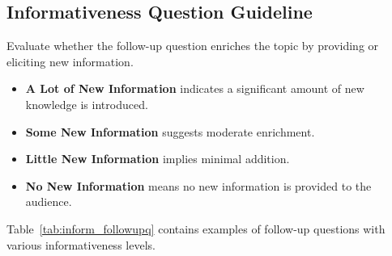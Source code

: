 \subsection{Informativeness Question Guideline}

Evaluate whether the follow-up question enriches the topic by providing or eliciting new information.

\begin{itemize}
    \item \textbf{A Lot of New Information} indicates a significant amount of new knowledge is introduced.
    \item \textbf{Some New Information} suggests moderate enrichment.
    \item \textbf{Little New Information} implies minimal addition.
    \item \textbf{No New Information} means no new information is provided to the audience.
\end{itemize}

Table~\ref{tab:inform_followupq} contains examples of follow-up questions with various informativeness levels.

